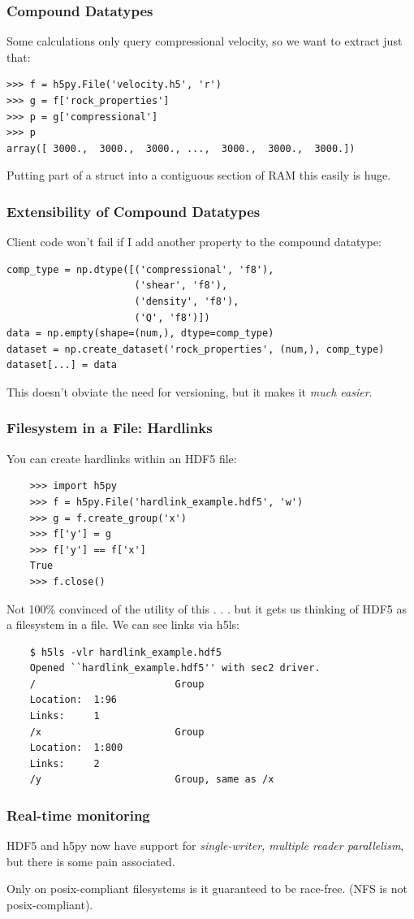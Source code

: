 \documentclass[9pt]{beamer}
\begin{document}
\begin{frame}[fragile]
\frametitle{Compound Datatypes}
Some calculations only query compressional velocity, so we want to extract just that:
\begin{verbatim}
>>> f = h5py.File('velocity.h5', 'r')
>>> g = f['rock_properties']
>>> p = g['compressional']
>>> p
array([ 3000.,  3000.,  3000., ...,  3000.,  3000.,  3000.])
\end{verbatim}
Putting part of a struct into a contiguous section of RAM this easily is huge.
\end{frame}

\begin{frame}[fragile]
\frametitle{Extensibility of Compound Datatypes}
Client code won't fail if I add another property to the compound datatype:
\begin{verbatim}
comp_type = np.dtype([('compressional', 'f8'),
                      ('shear', 'f8'),
                      ('density', 'f8'),
                      ('Q', 'f8')])
data = np.empty(shape=(num,), dtype=comp_type) 
dataset = np.create_dataset('rock_properties', (num,), comp_type)
dataset[...] = data
\end{verbatim}
This doesn't obviate the need for versioning, but it makes it \emph{much easier}.
\end{frame}


\begin{frame}[fragile]
  \frametitle{Filesystem in a File: Hardlinks}
  You can create hardlinks within an HDF5 file:
  \begin{verbatim}
    >>> import h5py
    >>> f = h5py.File('hardlink_example.hdf5', 'w')
    >>> g = f.create_group('x')
    >>> f['y'] = g
    >>> f['y'] == f['x']
    True
    >>> f.close()
  \end{verbatim}
  Not 100\% convinced of the utility of this . . . but it gets us thinking of HDF5 as a filesystem in a file. We can see links via h5ls:
  \begin{verbatim}
    $ h5ls -vlr hardlink_example.hdf5
    Opened ``hardlink_example.hdf5'' with sec2 driver.
    /                        Group
    Location:  1:96
    Links:     1
    /x                       Group
    Location:  1:800
    Links:     2
    /y                       Group, same as /x
  \end{verbatim}
\end{frame}

\begin{frame}
  \frametitle{Real-time monitoring}
  HDF5 and h5py now have support for \emph{single-writer, multiple reader parallelism}, but there is some pain associated.

  Only on posix-compliant filesystems is it guaranteed to be race-free. (NFS is not posix-compliant).
\end{frame}
\end{document}
